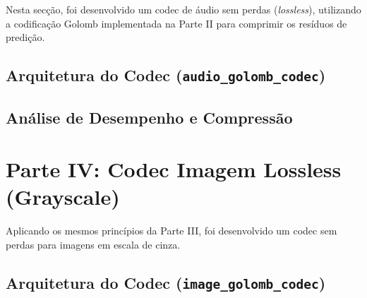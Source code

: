 \documentclass[a4paper, 11pt, portuguese]{article}
\begin{document}
Nesta secção, foi desenvolvido um codec de áudio sem perdas (\textit{lossless}), utilizando a codificação Golomb implementada na Parte II para comprimir os resíduos de predição.

\subsection{Arquitetura do Codec (\texttt{audio\_golomb\_codec})}


\subsection{Análise de Desempenho e Compressão}



\section{Parte IV: Codec Imagem Lossless (Grayscale)}

Aplicando os mesmos princípios da Parte III, foi desenvolvido um codec sem perdas para imagens em escala de cinza.

\subsection{Arquitetura do Codec (\texttt{image\_golomb\_codec})}
\end{document}
